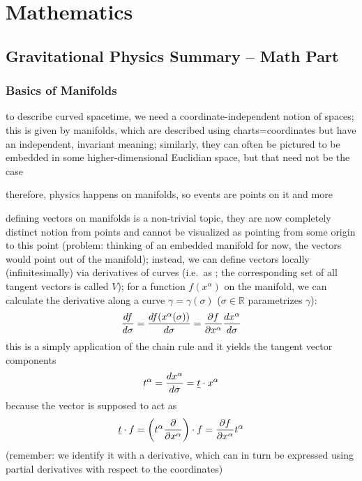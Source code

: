 \documentclass[ART_main.tex]{subfiles}
\begin{document}
\chapter{Mathematics}


	\section{Gravitational Physics Summary -- Math Part}
		\subsection{Basics of Manifolds}
to describe curved spacetime, we need a coordinate-independent notion of spaces; this is given by manifolds, which are described using charts=coordinates but have an independent, invariant meaning; similarly, they can often be pictured to be embedded in some higher-dimensional Euclidian space, but that need not be the case

therefore, physics happens on manifolds, so events are points on it and more


defining vectors on manifolds is a non-trivial topic, they are now completely distinct notion from points and cannot be visualized as pointing from some origin to this point (problem: thinking of an embedded manifold for now, the vectors would point out of the manifold); instead, we can define vectors locally (infinitesimally) via derivatives of curves (i.e.~as ; the corresponding set of all tangent vectors is called  $V$); for a function $f(x^\alpha)$ on the manifold, we can calculate the derivative along a curve $\gamma = \gamma(\sigma)$ ($\sigma \in \mathbb{R}$ parametrizes $\gamma$):
\begin{equation}
\dv{f}{\sigma} = \dv{f(x^\alpha(\sigma))}{\sigma} = \pdv{f}{x^\alpha} \dv{x^\alpha}{\sigma}
\end{equation}
this is a simply application of the chain rule and it yields the tangent vector components
\begin{equation}
t^\alpha = \dv{x^\alpha}{\sigma} = \underline{t} \cdot x^\alpha
\end{equation}
because the vector is supposed to act as
\begin{equation}
\underline{t} \cdot f = \qty(t^\alpha \pdv{x^\alpha}) \cdot f = \pdv{f}{x^\alpha} t^\alpha
\end{equation}
(remember: we identify it with a derivative, which can in turn be expressed using partial derivatives with respect to the coordinates)
\end{document}
